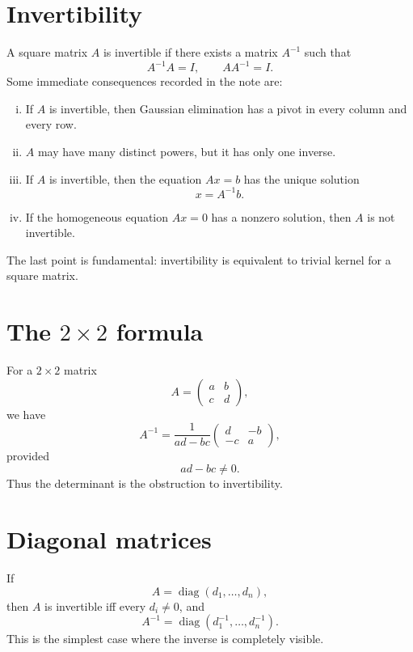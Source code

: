 
\section{Invertibility}

A square matrix \(A\) is invertible if there exists a matrix \(A^{-1}\) such that
\[
  A^{-1}A=I,\qquad AA^{-1}=I.
\]
Some immediate consequences recorded in the note are:
\begin{enumerate}[(i)]
  \item If \(A\) is invertible, then Gaussian elimination has a pivot in every column and every row.
  \item \(A\) may have many distinct powers, but it has only one inverse.
  \item If \(A\) is invertible, then the equation \(Ax=b\) has the unique solution
  \[
    x=A^{-1}b.
  \]
  \item If the homogeneous equation \(Ax=0\) has a nonzero solution, then \(A\) is not invertible.
\end{enumerate}

The last point is fundamental: invertibility is equivalent to trivial kernel for a square matrix.

\section[The 2 x 2 formula]{The \(2\times2\) formula}

For a \(2\times2\) matrix
\[
  A=\begin{pmatrix}a&b\\ c&d\end{pmatrix},
\]
we have
\[
  A^{-1}=\frac1{ad-bc}\begin{pmatrix}d&-b\\ -c&a\end{pmatrix},
\]
provided
\[
  ad-bc\neq0.
\]
Thus the determinant is the obstruction to invertibility.

\section{Diagonal matrices}

If
\[
  A=\operatorname{diag}(d_1,\ldots,d_n),
\]
then \(A\) is invertible iff every \(d_i\neq0\), and
\[
  A^{-1}=\operatorname{diag}(d_1^{-1},\ldots,d_n^{-1}).
\]
This is the simplest case where the inverse is completely visible.

